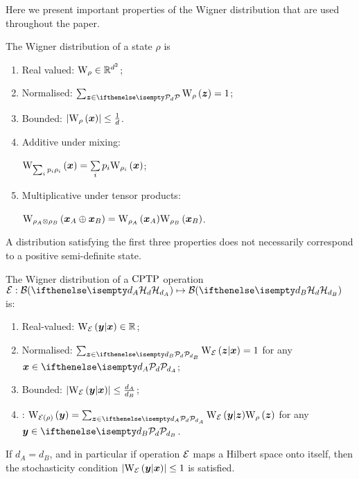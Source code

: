 Here we present important properties of the Wigner distribution that are used throughout the paper.

\begin{proposition}\label{thm:wstate}
    The Wigner distribution of a state $\rho$ is
    \begin{enumerate}%
        \item\label{en:w1} Real valued: $\W{\rho} \in \mathbb{R}^{d^2}$;
        \item\label{en:w2} Normalised: $\sum_{\bmz \in \pd} \W[\bmz]{\rho}=1$;
        \item\label{en:w3} Bounded: $\abs{\W[\bmx]{\rho}} \leq \frac{1}{d}$.
        \item\label{en:w4} Additive under mixing:
        
        $\W[\bmx]{\sum_i p_i \rho_i} = \sum\limits_i p_i \W[\bmx]{\rho_i}$;
        \item\label{en:w5} Multiplicative under tensor products: 
        
        $\W[\bmx_A \oplus \bmx_B]{\rho_A \otimes \rho_B} = \W[\bmx_A]{\rho_A}\W[\bmx_B]{\rho_B}$.
	\end{enumerate}
\end{proposition}
A distribution satisfying the first three properties does not necessarily correspond to a positive semi-definite state.

\begin{proposition}
    \label{thm:wchannel}
    The Wigner distribution of a ${\rm{CPTP}}$ operation $\E: \cal{B}(\hd[d_A]) \mapsto \cal{B}(\hd[d_B])$ is:
    \begin{enumerate}
        \item\label{en:wo1} Real-valued: $\W[\bmy|\bmx]{\E} \in \mathbb{R}$;
        \item\label{en:wo2} Normalised: $\sum_{\bmz \in \pd[d_B]} \W[\bmz|\bmx]{\E} = 1$ for any $\bmx \in \pd[d_A]$;
        \item\label{en:wo3} Bounded: $\abs{\W[\bmy|\bmx]{\E}} \leq \frac{d_A}{d_B}$;
	    \item\label{en:wo4} : $\W[\bmy]{\E(\rho)} = \sum_{\bmz \in \pd[d_A]} \W[\bmy|\bmz]{\E} \W[\bmz]{\rho}$ for any $\bmy \in \pd[d_B]$.
    \end{enumerate}
\end{proposition}
If $d_A = d_B$, and in particular if operation $\mathcal{E}$ maps a Hilbert space onto itself, then the stochasticity condition $\abs{\W[\bmy|\bmx]{\E}} \leq 1$ is satisfied.